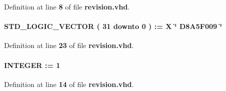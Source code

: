 Definition at line {\bf 8} of file {\bf revision.\+vhd}.

\paragraph[{M\+A\+G\+I\+C\+\_\+\+N\+UM}]{ {\bfseries \textcolor{comment}{S\+T\+D\+\_\+\+L\+O\+G\+I\+C\+\_\+\+V\+E\+C\+T\+OR}\textcolor{vhdlchar}{ }\textcolor{vhdlchar}{(}\textcolor{vhdlchar}{ }\textcolor{vhdlchar}{ } \textcolor{vhdldigit}{31} \textcolor{vhdlchar}{ }\textcolor{keywordflow}{downto}\textcolor{vhdlchar}{ }\textcolor{vhdlchar}{ } \textcolor{vhdldigit}{0} \textcolor{vhdlchar}{ }\textcolor{vhdlchar}{)}\textcolor{vhdlchar}{ }\textcolor{vhdlchar}{ }\textcolor{vhdlchar}{ }\textcolor{vhdlchar}{\+:}\textcolor{vhdlchar}{=}\textcolor{vhdlchar}{ }\textcolor{vhdlchar}{ }\textcolor{vhdlchar}{X}\textcolor{vhdlchar}{ }\textcolor{keyword}{\char`\"{} D8\+A5\+F009 \char`\"{}}\textcolor{vhdlchar}{ }} \hspace{0.3cm}{\ttfamily [Constant]}}\label{classrevisions_a23d31ae4661de78debd4a67f3396b1d0}


Definition at line {\bf 23} of file {\bf revision.\+vhd}.

\paragraph[{M\+A\+J\+O\+R\+\_\+\+R\+EV}]{ {\bfseries \textcolor{comment}{I\+N\+T\+E\+G\+ER}\textcolor{vhdlchar}{ }\textcolor{vhdlchar}{ }\textcolor{vhdlchar}{\+:}\textcolor{vhdlchar}{=}\textcolor{vhdlchar}{ }\textcolor{vhdlchar}{ } \textcolor{vhdldigit}{1} \textcolor{vhdlchar}{ }} \hspace{0.3cm}{\ttfamily [Constant]}}\label{classrevisions_ab8b85d7c34a69c484af0fec6f9399d53}


Definition at line {\bf 14} of file {\bf revision.\+vhd}.

